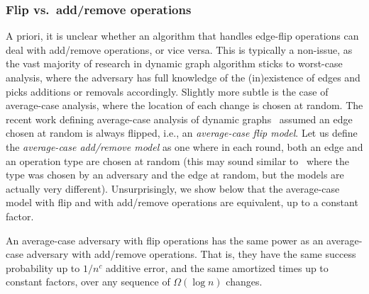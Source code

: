 \documentclass[letter,11pt]{article}
\begin{document}
\subsubsection*{Flip vs.~add/remove operations} A priori, it is unclear whether an algorithm that handles edge-flip operations can deal with add/remove operations, or vice versa.
This is typically a non-issue, as the vast majority of research in dynamic graph algorithm sticks to worst-case analysis, where the adversary has full knowledge of the (in)existence of edges and picks additions or removals accordingly.
Slightly more subtle is the case of average-case analysis, where the location of each change is chosen at random. 
The recent work defining average-case analysis of dynamic graphs~\cite{HLS22} assumed an edge chosen at random is always flipped, i.e., an \emph{average-case flip model}.
Let us define the \emph{average-case add/remove model} as one where in each round, both an edge and an operation type are chosen at random 
(this may sound similar to~\cite{AlbertsH98} where the type was chosen by an adversary and the edge at random,
but the models are actually very different).
Unsurprisingly, we show below that the average-case model with flip and with add/remove operations are equivalent, up to a constant factor.


\begin{claim}
	\label{claim:random flip vs ar}
	An average-case adversary with flip operations has the same power as an average-case adversary with add/remove operations.
	That is, 
	they have the same success probability up to $1/n^c$ additive error, and the same amortized times up to constant factors, over any sequence of $\Omega(\log n)$ changes.
\end{claim}
\end{document}
